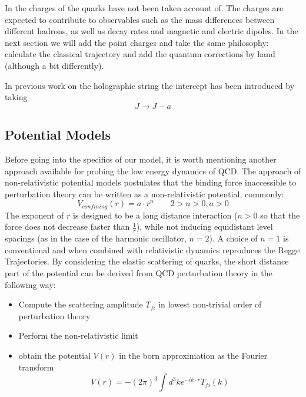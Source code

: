 \documentclass[11pt,a4paper]{article}
\begin{document}
In \cite{Sonnenschein14} the charges of the quarks have not been taken account of. The charges are expected to contribute to observables such as the mass differences between different hadrons, as well as decay rates and magnetic and electric dipoles. In the next section we will add the point charges and take the same philosophy: calculate the classical trajectory and add the quantum corrections by hand (although a bit differently).

In previous work on the holographic string\cite{Sonnenschein14} the intercept has been introduced by taking
\begin{equation}
J\rightarrow J-a
\end{equation}

\subsection{Potential Models}
\label{sec:potentialmodels}
Before going into the specifics of our model, it is worth mentioning another approach available for probing the low energy dynamics of QCD. The approach of non-relativistic potential models \cite{LUCHA89} postulates that the binding force inaccessible to perturbation theory can be written as a non-relativistic potential, commonly:
\begin{equation}
V_{confining}(r)=a\cdot r^n \qquad 2>n>0,a>0
\end{equation}
The exponent of $r$ is designed to be a long distance interaction ($n>0$ so that the force does not decrease faster than $\frac{1}{r}$), while not inducing equidistant level spacings (as in the case of the harmonic oscillator, $n=2$). A choice of $n=1$ is conventional and when combined with relativistic dynamics reproduces the Regge Trajectories. By considering the elastic scattering of quarks, the short distance part of the potential can be derived from QCD perturbation theory in the following way:
\begin{itemize}
\item Compute the scattering amplitude $T_{fi}$ in lowest non-trivial order of perturbation theory
\item Perform the non-relativistic limit
\item obtain the potential $V(r)$ in the born approximation as the Fourier transform
\begin{equation}
V(r)=-(2\pi)^3\int d^3k e^{-ik\cdot r}T_{fi}(k)
\end{equation}
\end{itemize}
\end{document}
